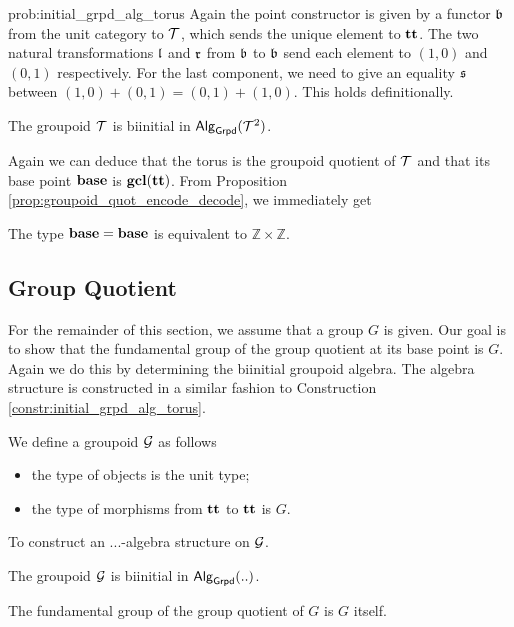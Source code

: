 \begin{construction}{prob:initial_grpd_alg_torus}
\label{constr:initial_grpd_alg_torus}
Again the point constructor is given by a functor $\mathfrak{b}$ from the unit category to $\mathcal{T}$, which sends the unique element to $\operatorname{\mathbf{tt}}$.
The two natural transformations $\mathfrak{l}$ and $\mathfrak{r}$ from $\mathfrak{b}$ to $\mathfrak{b}$ send each element to $(1, 0)$ and $(0, 1)$ respectively.
For the last component, we need to give an equality $\mathfrak{s}$ between $(1, 0) + (0, 1) = (0, 1) + (1, 0)$.
This holds definitionally.
\end{construction}

\begin{proposition}
The groupoid $\mathcal{T}$ is biinitial in $\mathsf{Alg}_{\mathsf{Grpd}}(\mathcal{T}^2)$.
\end{proposition}

Again we can deduce that the torus is the groupoid quotient of $\mathcal{T}$ and that its base point $\operatorname{\mathbf{base}}$ is $\operatorname{\mathbf{gcl}}(\operatorname{\mathbf{tt}})$.
From Proposition \ref{prop:groupoid_quot_encode_decode}, we immediately get

\begin{corollary}
The type $\operatorname{\mathbf{base}} = \operatorname{\mathbf{base}}$ is equivalent to $\mathbb{Z} \times \mathbb{Z}$.
\end{corollary}

\subsection{Group Quotient}
\label{sec:group_quotient_fund_group}
For the remainder of this section, we assume that a group $G$ is given.
Our goal is to show that the fundamental group of the group quotient at its base point is $G$.
Again we do this by determining the biinitial groupoid algebra.
The algebra structure is constructed in a similar fashion to Construction \ref{constr:initial_grpd_alg_torus}.

\begin{definition}
We define a groupoid $\mathcal{G}$ as follows
\begin{itemize}
	\item the type of objects is the unit type;
	\item the type of morphisms from $\operatorname{\mathbf{tt}}$ to $\operatorname{\mathbf{tt}}$ is $G$.
\end{itemize}
\end{definition}

\begin{problem}
\label{prob:initial_grpd_alg_group_quot}
To construct an ...-algebra structure on $\mathcal{G}$.
\end{problem}

\begin{proposition}
The groupoid $\mathcal{G}$ is biinitial in $\mathsf{Alg}_{\mathsf{Grpd}}(..)$.
\end{proposition}

\begin{corollary}
The fundamental group of the group quotient of $G$ is $G$ itself.
\end{corollary}